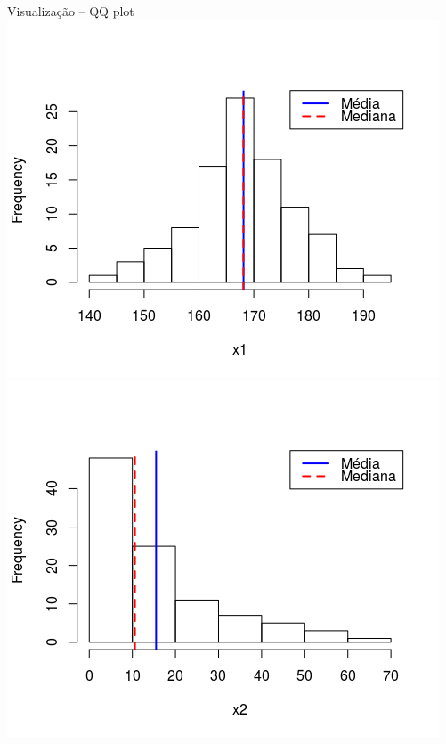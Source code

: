 \documentclass{beamer}
\begin{document}
\begin{frame}{\scriptsize Visualização -- QQ plot}
  \centering
  \includegraphics[height=.5\textheight]{Cap37-38/normal2-h}
  \includegraphics[height=.5\textheight]{Cap37-38/lognormal2-h}


\end{frame}
\end{document}

